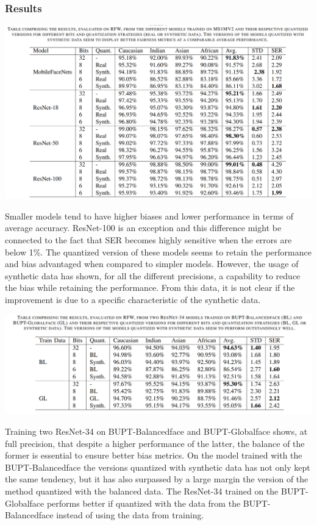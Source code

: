 \documentclass[12pt]{article}
\begin{document}
\subsubsection{Results}
\begin{center}
  \includegraphics*[scale = 0.7]{table25.png}
\end{center}
Smaller models tend to have higher biases and lower performance in terms
of average accuracy. ResNet-100 is an exception and this
difference might be connected to the fact that SER becomes
highly sensitive when the errors are below 1\%. The quantized version of these models seems to retain the
performance and bias advantaged when compared to simpler
models. However,
the usage of synthetic data has shown, for all the different
precisions, a capability to reduce the bias while retaining the
performance. From this data, it is not clear if the improvement
is due to a specific characteristic of the synthetic data.
\begin{center}
  \includegraphics*{table26.png}
\end{center}
Training two ResNet-34 on BUPT-Balancedface and
BUPT-Globalface shows, at full precision, that despite a higher
performance of the latter, the balance of the former is essential
to ensure better bias metrics. On the model trained with the
BUPT-Balancedface the versions quantized with synthetic data
has not only kept the same tendency, but it has also surpassed by a large margin the version of
the method quantized with the balanced data. The ResNet-34 trained on the BUPT-Globalface performs
better if quantized with the data from the BUPT-Balancedface
instead of using the data from training. 
\end{document}
